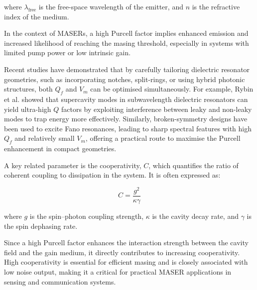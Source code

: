 where $\lambda_{\text{free}}$ is the free-space wavelength of the emitter, and
$n$ is the refractive index of the medium.

In the context of MASERs, a high Purcell factor implies enhanced emission and
increased likelihood of reaching the masing threshold, especially in systems
with limited pump power or low intrinsic gain.

Recent studies have demonstrated that by carefully tailoring dielectric
resonator geometries, such as incorporating notches, split-rings, or using
hybrid photonic structures, both $Q_f$ and $V_m$ can be optimised
simultaneously\autocite{campione2016broken}. For example, Rybin et al. showed
that supercavity modes in subwavelength dielectric resonators can yield
ultra-high $Q$ factors by exploiting interference between leaky and non-leaky
modes to trap energy more effectively\autocite{rybin2017high}. Similarly,
broken-symmetry designs have been used to excite Fano resonances, leading to
sharp spectral features with high $Q_f$ and relatively small $V_m$, offering a
practical route to maximise the Purcell enhancement in compact
geometries\autocite{campione2016broken}.

A key related parameter is the cooperativity, $C$, which quantifies the ratio of
coherent coupling to dissipation in the
system\autocite{wen2023spin,sherman2021performance}. It is often expressed as:

\begin{equation}
  C = \frac{g^2}{\kappa \gamma}
\end{equation}

where $g$ is the spin–photon coupling strength, $\kappa$ is the cavity decay
rate, and $\gamma$ is the spin dephasing rate.

Since a high Purcell factor enhances the interaction strength between the cavity
field and the gain medium, it directly contributes to increasing cooperativity.
High cooperativity is essential for efficient masing and is closely associated
with low noise output, making it a critical for practical MASER applications in
sensing and communication systems\autocite{sherman2021performance}.

